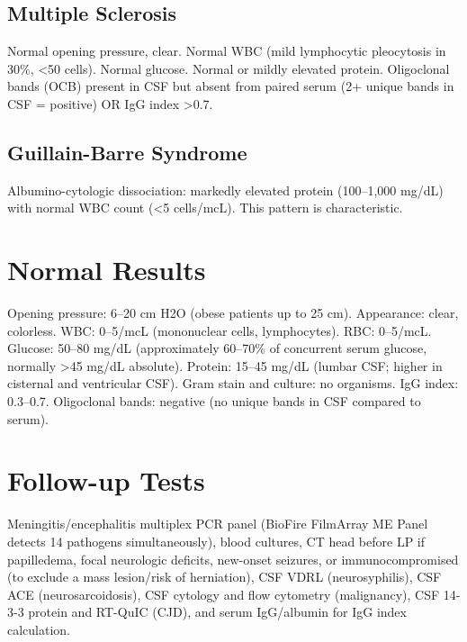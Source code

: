 \subsection*{Multiple Sclerosis}
Normal opening pressure, clear. Normal WBC (mild lymphocytic pleocytosis in 30\%, <50 cells). Normal glucose. Normal or mildly elevated protein. Oligoclonal bands (OCB) present in CSF but absent from paired serum (2+ unique bands in CSF = positive) OR IgG index >0.7.
\subsection*{Guillain-Barre Syndrome}
Albumino-cytologic dissociation: markedly elevated protein (100--1,000 mg/dL) with normal WBC count (<5 cells/mcL). This pattern is characteristic.
\section*{Normal Results}
Opening pressure: 6--20 cm H2O (obese patients up to 25 cm). Appearance: clear, colorless. WBC: 0--5/mcL (mononuclear cells, lymphocytes). RBC: 0--5/mcL. Glucose: 50--80 mg/dL (approximately 60--70\% of concurrent serum glucose, normally >45 mg/dL absolute). Protein: 15--45 mg/dL (lumbar CSF; higher in cisternal and ventricular CSF). Gram stain and culture: no organisms. IgG index: 0.3--0.7. Oligoclonal bands: negative (no unique bands in CSF compared to serum).
\section*{Follow-up Tests}
Meningitis/encephalitis multiplex PCR panel (BioFire FilmArray ME Panel detects 14 pathogens simultaneously), blood cultures, CT head before LP if papilledema, focal neurologic deficits, new-onset seizures, or immunocompromised (to exclude a mass lesion/risk of herniation), CSF VDRL (neurosyphilis), CSF ACE (neurosarcoidosis), CSF cytology and flow cytometry (malignancy), CSF 14-3-3 protein and RT-QuIC (CJD), and serum IgG/albumin for IgG index calculation.
